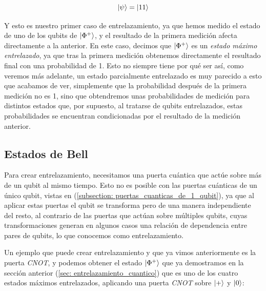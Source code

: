 \documentclass[12pt]{article}
\numberwithin{equation}{section} %
\begin{document}
    \begin{equation*}
        \ket{\psi} = \ket{1 1}
    \end{equation*}

    \vspace{2.5mm}

    Y esto es nuestro primer caso de entrelazamiento, ya que hemos medido el estado de uno de los qubits de \( \ket{\Phi^{+}} \), y el resultado de la primera medición afecta directamente a la anterior. En este caso, decimos que \( \ket{\Phi^{+}} \) es un \textit{estado máximo entrelazado}, ya que tras la primera medición obtenemos directamente el resultado final con una probabilidad de 1. Esto no siempre tiene por qué ser así, como veremos más adelante, un estado parcialmente entrelazado es muy parecido a esto que acabamos de ver, simplemente que la probabilidad después de la primera medición no es 1, sino que obtendremos unas probabilidades de medición para distintos estados que, por supuesto, al tratarse de qubits entrelazados, estas probabilidades se encuentran condicionadas por el resultado de la medición anterior.

    \vspace{5mm}




    
    \subsection{Estados de Bell}

    \vspace{5mm}

    Para crear entrelazamiento, necesitamos una puerta cuántica que actúe sobre más de un qubit al mismo tiempo. Esto no es posible con las puertas cuánticas de un único qubit, vistas en (\ref{subsection: puertas_cuanticas_de_1_qubit}), ya que al aplicar estas puertas el qubit se transforma pero de una manera independiente del resto, al contrario de las puertas que actúan sobre múltiples qubits, cuyas transformaciones generan en algunos casos una relación de dependencia entre pares de qubits, lo que conocemos como entrelazamiento.

    \vspace{5mm}

    Un ejemplo que puede crear entrelazamiento y que ya vimos anteriormente es la puerta \textit{CNOT}, y podemos obtener el estado \( \ket{\Phi^{+}} \) que ya demostramos en la sección anterior (\ref{sec: entrelazamiento_cuantico}) que es uno de los cuatro estados máximos entrelazados, aplicando una puerta \textit{CNOT} sobre \( \ket{+} \) y \( \ket{0} \):
    
\end{document}
